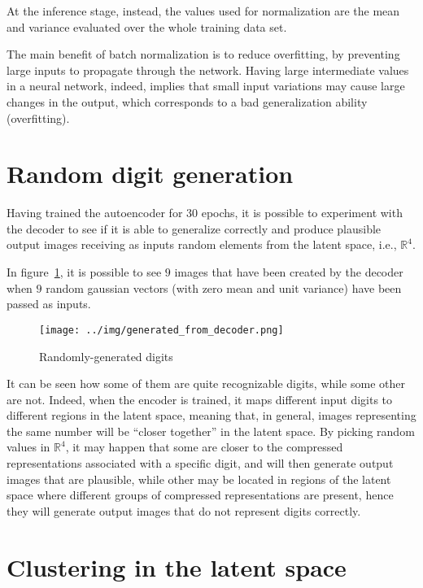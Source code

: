 \documentclass[12pt]{article}
\begin{document}
At the inference stage, instead, the values used for normalization are the mean and variance evaluated over the whole training data set.

The main benefit of batch normalization is to reduce overfitting, by preventing large inputs to propagate through the network.
Having large intermediate values in a neural network, indeed, implies that small input variations may cause large changes in the output, which corresponds to a bad generalization ability (overfitting).

\section{Random digit generation}\label{sec:c}

Having trained the autoencoder for $30$ epochs, it is possible to experiment with the decoder to see if it is able to generalize correctly and produce plausible output images receiving as inputs random elements from the latent space, i.e., $\mathbb{R}^4$.

In figure\ \ref{fig:rand_digits}, it is possible to see $9$ images that have been created by the decoder when $9$ random gaussian vectors (with zero mean and unit variance) have been passed as inputs.

\begin{figure}[ht]
  \centering
  \texttt{[image: ../img/generated\_from\_decoder.png]}
  \caption{Randomly-generated digits}\label{fig:rand_digits}
\end{figure}

It can be seen how some of them are quite recognizable digits, while some other are not.
Indeed, when the encoder is trained, it maps different input digits to different regions in the latent space, meaning that, in general, images representing the same number will be ``closer together'' in the latent space.
By picking random values in $\mathbb{R}^4$, it may happen that some are closer to the compressed representations associated with a specific digit, and will then generate output images that are plausible, while other may be located in regions of the latent space where different groups of compressed representations are present, hence they will generate output images that do not represent digits correctly.

\section{Clustering in the latent space}\label{sec:d}
\end{document}
